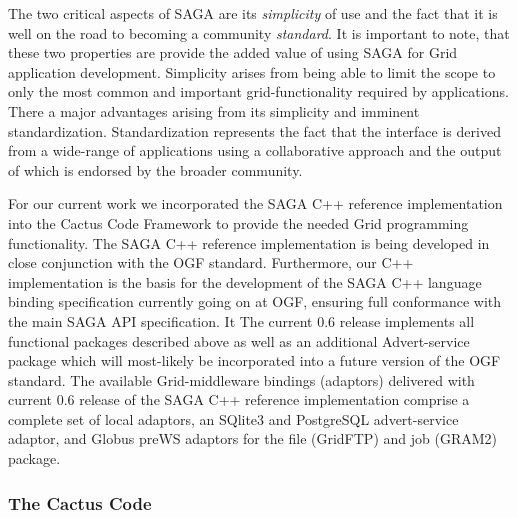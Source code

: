 \documentclass[conference,final]{IEEEtran}
\newcommand{\jhanote}[1]{ {\textcolor{red} { ***Jha: #1 }}}
\begin{document}
The two critical aspects of SAGA are its {\it simplicity} of use and the
fact that it is well on the road to becoming a community {\it standard}.
It is important to note, that these two properties are 
provide the added value of using SAGA for Grid application development.
Simplicity arises from being able to limit the scope to only the most
common and important grid-functionality required by applications.
There a major advantages arising from its simplicity and imminent
standardization.  Standardization represents the fact that the
interface is derived from a wide-range of applications using a
collaborative approach and the output of which is endorsed by the
broader community.

For our current work we incorporated the SAGA C++ reference
implementation~\cite{saga_web} into the Cactus Code Framework to
provide the needed Grid programming functionality. The SAGA C++
reference implementation is being developed in close conjunction with
the OGF standard. Furthermore, our C++ implementation is the basis 
for the development of the SAGA C++ language binding specification 
currently going on at OGF, ensuring
full conformance with the main SAGA API specification.
It The current 0.6 release implements all
functional packages described above as well as an additional
Advert-service package which will most-likely be incorporated into a
future version of the OGF standard.  The available Grid-middleware
bindings (adaptors) delivered with current 0.6 release of the SAGA C++
reference implementation comprise a complete set of local adaptors, an
SQlite3 and PostgreSQL advert-service adaptor, and Globus preWS
adaptors for the file (GridFTP) and job (GRAM2) package.



\subsubsection{The Cactus Code~\cite{cactus_web}}
\end{document}
